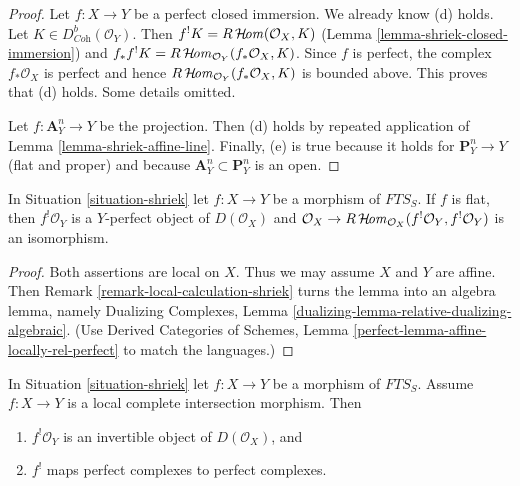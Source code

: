 \begin{proof}
\medskip\noindent
Let $f : X \to Y$ be a perfect closed immersion. We already know (d) holds.
Let $K \in D^b_{\textit{Coh}}(\mathcal{O}_Y)$.
Then $f^!K = R\mathop{\mathcal{H}\!\mathit{om}}\nolimits(\mathcal{O}_X, K)$
(Lemma \ref{lemma-shriek-closed-immersion})
and $f_*f^!K = R\mathop{\mathcal{H}\!\mathit{om}}\nolimits_{\mathcal{O}_Y}(f_*\mathcal{O}_X, K)$.
Since $f$ is perfect, the complex $f_*\mathcal{O}_X$ is perfect
and hence $R\mathop{\mathcal{H}\!\mathit{om}}\nolimits_{\mathcal{O}_Y}(f_*\mathcal{O}_X, K)$ is bounded above.
This proves that (d) holds. Some details omitted.

\medskip\noindent
Let $f : \mathbf{A}^n_Y \to Y$ be the projection. Then (d) holds
by repeated application of Lemma \ref{lemma-shriek-affine-line}.
Finally, (e) is true because it holds for $\mathbf{P}^n_Y \to Y$
(flat and proper) and because $\mathbf{A}^n_Y \subset \mathbf{P}^n_Y$
is an open.
\end{proof}

\begin{lemma}
\label{lemma-flat-shriek-relatively-perfect}
In Situation \ref{situation-shriek} let $f : X \to Y$ be a morphism of
$\textit{FTS}_S$. If $f$ is flat, then
$f^!\mathcal{O}_Y$ is a $Y$-perfect object of $D(\mathcal{O}_X)$ and
$\mathcal{O}_X \to
R\mathop{\mathcal{H}\!\mathit{om}}\nolimits_{\mathcal{O}_X}(f^!\mathcal{O}_Y, f^!\mathcal{O}_Y)$
is an isomorphism.
\end{lemma}

\begin{proof}
Both assertions are local on $X$. Thus we may assume $X$ and $Y$ are
affine. Then Remark \ref{remark-local-calculation-shriek}
turns the lemma into an algebra lemma, namely
Dualizing Complexes, Lemma \ref{dualizing-lemma-relative-dualizing-algebraic}.
(Use Derived Categories of Schemes, Lemma
\ref{perfect-lemma-affine-locally-rel-perfect} to match the languages.)
\end{proof}

\begin{lemma}
\label{lemma-lci-shriek}
In Situation \ref{situation-shriek} let $f : X \to Y$ be a morphism of
$\textit{FTS}_S$. Assume $f : X \to Y$ is a local complete
intersection morphism. Then
\begin{enumerate}
\item $f^!\mathcal{O}_Y$ is an invertible object of $D(\mathcal{O}_X)$, and
\item $f^!$ maps perfect complexes to perfect complexes.
\end{enumerate}
\end{lemma}

